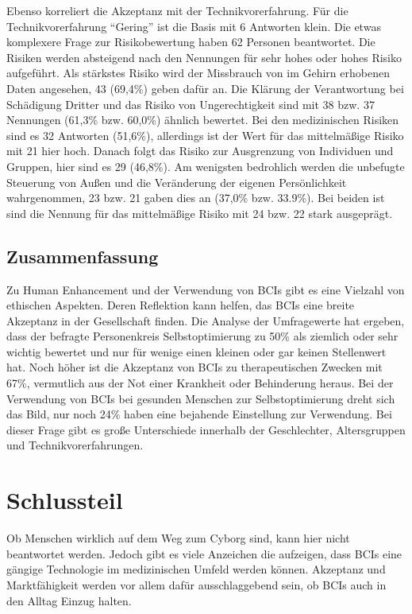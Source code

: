 \documentclass[11pt,ngerman,parskip=half]{scrartcl}
\begin{document}
Ebenso korreliert die Akzeptanz mit der Technikvorerfahrung. Für die
Technikvorerfahrung \enquote{Gering} ist die Basis mit 6 Antworten klein.
Die etwas komplexere Frage zur Risikobewertung haben 62 Personen beantwortet.
Die Risiken werden absteigend nach den Nennungen für sehr hohes oder hohes
Risiko aufgeführt. Als stärkstes Risiko wird der Missbrauch von im Gehirn
erhobenen Daten angesehen, 43 (69,4\%) geben dafür an. Die Klärung der
Verantwortung bei Schädigung Dritter und das Risiko von Ungerechtigkeit sind
mit 38 bzw. 37 Nennungen (61,3\% bzw. 60,0\%) ähnlich bewertet. Bei den
medizinischen Risiken sind es 32 Antworten (51,6\%), allerdings ist der Wert
für das mittelmäßige Risiko mit 21 hier hoch. Danach folgt das Risiko zur
Ausgrenzung von Individuen und Gruppen, hier sind es 29 (46,8\%). Am wenigsten
bedrohlich werden die unbefugte Steuerung von Außen und die Veränderung der
eigenen Persönlichkeit wahrgenommen, 23 bzw. 21 gaben dies an (37,0\% bzw.
33.9\%). Bei beiden ist sind die Nennung für das mittelmäßige Risiko mit 24
bzw. 22 stark ausgeprägt.

\subsection{Zusammenfassung}
\label{subsec:kathrin_zusammenfassung}
Zu Human Enhancement und der Verwendung von BCIs gibt es eine Vielzahl von
ethischen Aspekten. Deren Reflektion kann helfen, das BCIs eine breite
Akzeptanz in der Gesellschaft finden. Die Analyse der Umfragewerte hat
ergeben, dass der befragte Personenkreis Selbstoptimierung zu 50\% als
ziemlich oder sehr wichtig bewertet und nur für wenige einen kleinen oder gar
keinen Stellenwert hat. Noch höher ist die Akzeptanz von BCIs zu
therapeutischen Zwecken mit 67\%, vermutlich aus der Not einer Krankheit oder
Behinderung heraus. Bei der Verwendung von BCIs bei gesunden Menschen zur
Selbstoptimierung dreht sich das Bild, nur noch 24\% haben eine bejahende
Einstellung zur Verwendung. Bei dieser Frage gibt es große Unterschiede
innerhalb der Geschlechter, Altersgruppen und Technikvorerfahrungen.

\pagebreak
\section{Schlussteil}
Ob Menschen wirklich auf dem Weg zum Cyborg sind, kann hier nicht beantwortet
werden. Jedoch gibt es viele Anzeichen die aufzeigen, dass BCIs eine gängige
Technologie im medizinischen Umfeld werden können. Akzeptanz und
Marktfähigkeit werden vor allem dafür ausschlaggebend sein, ob BCIs auch in
den Alltag Einzug halten.
\end{document}
